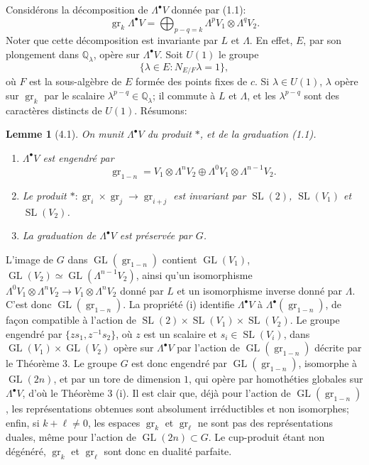 \documentclass[11pt]{article}
\newcommand{\Q}{\mathbb Q}
\newcommand{\GL}{\operatorname{GL}}
\newcommand{\SL}{\operatorname{SL}}
\newcommand{\gr}{\operatorname{gr}}
\theoremstyle{deligne}
\newtheorem*{lemma*}{Lemme}
\begin{document}
\begin{enumerate}[label=(\alph*)]
Considérons la décomposition de $\Lambda^\bullet V$ donnée par (1.1):
\[
\gr_k\Lambda^\bullet V=\bigoplus_{p-q=k}\Lambda^pV_1\otimes\Lambda^qV_2.
\]
Noter que cette décomposition est invariante par $L$ et $\Lambda$. En effet, $E$, par son plongement dans $\Q_\lambda$, opère sur $\Lambda^\bullet V$. Soit $U(1)$ le groupe
\[
\{\lambda\in E:N_{E/F}\lambda=1\},
\]
où $F$ est la sous-algèbre de $E$ formée des points fixes de $c$. Si $\lambda\in U(1)$, $\lambda$ opère sur $\gr_k$ par le scalaire $\lambda^{p-q}\in\Q_\lambda$; il commute à $L$ et $\Lambda$, et les $\lambda^{p-q}$ sont des caractères distincts de $U(1)$. Résumons:
\end{enumerate}

\begin{lemma*}[4.1]
On munit $\Lambda^\bullet V$ du produit $*$, et de la graduation (1.1).
\begin{enumerate}[label=(\roman*)]
\item $\Lambda^\bullet V$ est engendré par
\[
\gr_{1-n}=V_1\otimes\Lambda^nV_2\oplus\Lambda^0V_1\otimes\Lambda^{n-1}V_2.
\]
\item Le produit $*: \gr_i\times\gr_j\to\gr_{i+j}$ est invariant par $\SL(2)$, $\SL(V_1)$ et $\SL(V_2)$.
\item La graduation de $\Lambda^\bullet V$ est préservée par $G$.
\end{enumerate}
\end{lemma*}

L'image de $G$ dans $\GL(\gr_{1-n})$ contient $\GL(V_1)$, $\GL(V_2)\simeq\GL(\Lambda^{n-1}V_2)$, ainsi qu'un isomorphisme $\Lambda^0V_1\otimes\Lambda^nV_2\to V_1\otimes\Lambda^nV_2$ donné par $L$ et un isomorphisme inverse donné par $\Lambda$. C'est donc $\GL(\gr_{1-n})$. La propriété (i) identifie $\Lambda^\bullet V$ à $\Lambda^\bullet(\gr_{1-n})$, de façon compatible à l'action de $\SL(2)\times\SL(V_1)\times\SL(V_2)$. Le groupe engendré par $\{zs_1,z^{-1}s_2\}$, où $z$ est un scalaire et $s_i\in\SL(V_i)$, dans $\GL(V_1)\times\GL(V_2)$ opère sur $\Lambda^\bullet V$ par l'action de $\GL(\gr_{1-n})$ décrite par le Théorème 3. Le groupe $G$ est donc engendré par $\GL(\gr_{1-n})$, isomorphe à $\GL(2n)$, et par un tore de dimension $1$, qui opère par homothéties globales sur $\Lambda^\bullet V$, d'où le Théorème 3 (i). Il est clair que, déjà pour l'action de $\GL(\gr_{1-n})$, les représentations obtenues sont absolument irréductibles et non isomorphes; enfin, si $k+\ell\ne0$, les espaces $\gr_k$ et $\gr_\ell$ ne sont pas des représentations duales, même pour l'action de $\GL(2n)\subset G$. Le cup-produit étant non dégénéré, $\gr_k$ et $\gr_\ell$ sont donc en dualité parfaite.
\end{document}
